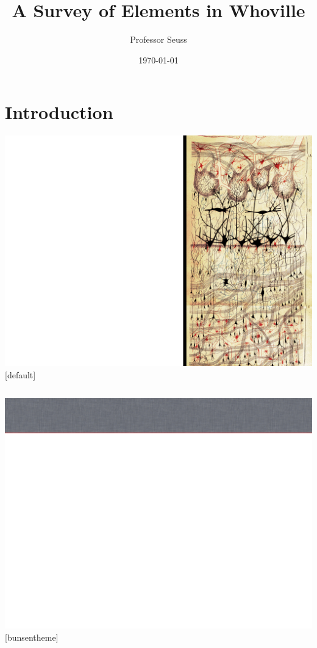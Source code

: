 \documentclass{beamer}
\title{A Survey of Elements in Whoville}
\author{Professor Seuss}
\institute[The Institute of Advanced Study]
{
Department of Chemistry \\
Whoville College \\
}
\date{\today}
\begin{document}
\section{Introduction}
{\includegraphics[width=\paperwidth,height=\paperheight]{theme/frontpage_bg}}
[default]

\begin{frame}
\vspace{2cm}
\begin{columns}
\column{2.75in}
  \titlepage
  \vspace{10cm}
\column{2.0in}
\end{columns}
\end{frame}

%
 {\includegraphics[width=\paperwidth,height=\paperheight]{theme/slide_bg}}
[bunsentheme]
\end{document}
